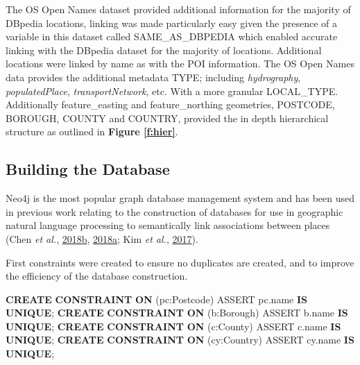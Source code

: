 \documentclass[10pt,]{article}
\renewcommand\texttt[1]{{\ttfamily\color{ttcolor}#1}}
\newenvironment{Shaded}{\begin{snugshade}}{\end{snugshade}}
\newcommand{\CharTok}[1]{\textcolor[rgb]{0.31,0.60,0.02}{#1}}
\newcommand{\KeywordTok}[1]{\textcolor[rgb]{0.13,0.29,0.53}{\textbf{#1}}}
\newcommand{\NormalTok}[1]{#1}
\begin{document}
The OS Open Names dataset provided additional information for the
majority of DBpedia locations, linking was made particularly easy given
the presence of a variable in this dataset called
\texttt{SAME\_AS\_DBPEDIA} which enabled accurate linking with the
DBpedia dataset for the majority of locations. Additional locations were
linked by name as with the POI information. The OS Open Names data
provides the additional metadata \texttt{TYPE}; including
\emph{hydrography}, \emph{populatedPlace}, \emph{transportNetwork}, etc.
With a more granular \texttt{LOCAL\_TYPE.} Additionally
\texttt{feature\_easting} and \texttt{feature\_northing} geometries,
\texttt{POSTCODE}, \texttt{BOROUGH}, \texttt{COUNTY} and
\texttt{COUNTRY}, provided the in depth hierarchical structure as
outlined in \textbf{Figure \ref{f:hier}}.

\hypertarget{building-the-database}{%
\subsection{Building the Database}\label{building-the-database}}

Neo4j is the most popular graph database management system and has been
used in previous work relating to the construction of databases for use
in geographic natural language processing to semantically link
associations between places (Chen \emph{et al.},
\protect\hyperlink{ref-chen2018}{2018}\protect\hyperlink{ref-chen2018}{b},
\protect\hyperlink{ref-chen2018a}{2018}\protect\hyperlink{ref-chen2018a}{a};
Kim \emph{et al.}, \protect\hyperlink{ref-kim2017}{2017}).

First constraints were created to ensure no duplicates are created, and
to improve the efficiency of the database construction.

\vspace{2mm}

\begin{Shaded}
\begin{Highlighting}[]
\KeywordTok{CREATE} \KeywordTok{CONSTRAINT} \KeywordTok{ON}\NormalTok{ (pc}\CharTok{:Postcode}\NormalTok{) ASSERT pc.name }\KeywordTok{IS} \KeywordTok{UNIQUE}\NormalTok{;}
\KeywordTok{CREATE} \KeywordTok{CONSTRAINT} \KeywordTok{ON}\NormalTok{ (b}\CharTok{:Borough}\NormalTok{) ASSERT b.name }\KeywordTok{IS} \KeywordTok{UNIQUE}\NormalTok{;}
\KeywordTok{CREATE} \KeywordTok{CONSTRAINT} \KeywordTok{ON}\NormalTok{ (c}\CharTok{:County}\NormalTok{) ASSERT c.name }\KeywordTok{IS} \KeywordTok{UNIQUE}\NormalTok{;}
\KeywordTok{CREATE} \KeywordTok{CONSTRAINT} \KeywordTok{ON}\NormalTok{ (cy}\CharTok{:Country}\NormalTok{) ASSERT cy.name }\KeywordTok{IS} \KeywordTok{UNIQUE}\NormalTok{;}
\end{Highlighting}
\end{Shaded}
\end{document}
